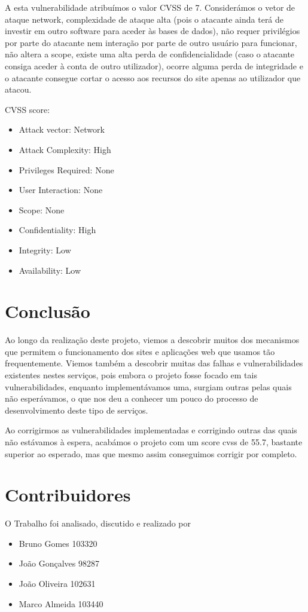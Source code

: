 \documentclass[12pt]{report}
\begin{document}
A esta vulnerabilidade atribuímos o valor CVSS de 7. Considerámos o vetor de ataque network, complexidade de ataque alta (pois o atacante ainda terá de investir em outro software para aceder às bases de dados), não requer privilégios por parte do atacante nem interação por parte de outro usuário para funcionar, não altera a scope, existe uma alta perda de confidencialidade (caso o atacante consiga aceder à conta de outro utilizador), ocorre alguma perda de integridade  e o atacante consegue cortar o acesso aos recursos do site apenas ao utilizador que atacou.\par 
CVSS score: \begin{itemize}
  \item Attack vector: Network
  \item Attack Complexity: High
  \item Privileges Required: None
  \item User Interaction: None
  \item Scope: None
  \item Confidentiality: High
  \item Integrity: Low
  \item Availability: Low
\end{itemize}

\newpage

\chapter{Conclusão}
  \quad Ao longo da realização deste projeto, viemos a descobrir muitos dos mecanismos que permitem o funcionamento dos sites e aplicações web que usamos tão frequentemente. Viemos também a descobrir muitas das falhas e vulnerabilidades existentes nestes serviços, pois embora o projeto fosse focado em tais vulnerabilidades, enquanto implementávamos uma, surgiam outras pelas quais não esperávamos, o que nos deu a conhecer um pouco do processo de desenvolvimento deste tipo de serviços.\par
  Ao corrigirmos as vulnerabilidades implementadas e corrigindo outras das quais não estávamos à espera, acabámos o projeto com um score cvss de 55.7, bastante superior ao esperado, mas que mesmo assim conseguimos corrigir por completo.
  
  \newpage



\chapter{Contribuidores}
O Trabalho foi analisado, discutido e realizado por
\begin{itemize}
  \item Bruno Gomes 103320
  \item João Gonçalves 98287
  \item João Oliveira 102631
  \item Marco Almeida 103440
\end{itemize}
\end{document}
